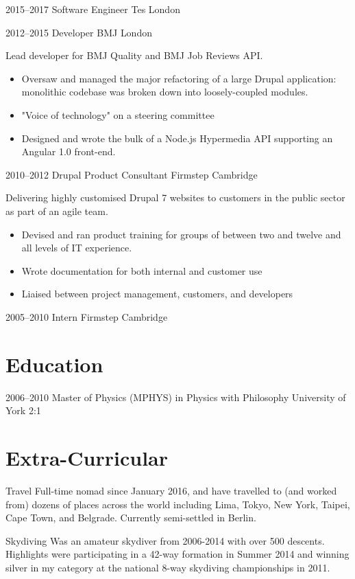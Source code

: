 \documentclass[10pt,a4paper,sans]{moderncv}
\begin{document}
\cventry
  {2015--2017}
  {Software Engineer}
  {Tes}
  {London}
  {}
  {}

\cventry
  {2012--2015}
  {Developer}
  {BMJ}
  {London}
  {}
  {
    Lead developer for BMJ Quality and BMJ Job Reviews API.
    \begin{itemize}
      \item Oversaw and managed the major refactoring of a large Drupal application: monolithic codebase was broken down into loosely-coupled modules.
      \item "Voice of technology" on a steering committee
      \item Designed and wrote the bulk of a Node.js Hypermedia API supporting an Angular 1.0 front-end.
    \end{itemize}
  }

\cventry
  {2010--2012}
  {Drupal Product Consultant}
  {Firmstep}
  {Cambridge}
  {}
  {
    Delivering highly customised Drupal 7 websites to customers in the public sector as part of an agile team.
    \begin{itemize}
      \item Devised and ran product training for groups of between two and twelve and all levels of IT experience.
      \item Wrote documentation for both internal and customer use
      \item Liaised between project management, customers, and developers
    \end{itemize}
  }

\cventry
  {2005--2010}
  {Intern}
  {Firmstep}
  {Cambridge}
  {}
  {}

\section{Education}

\cventry
  {2006--2010}
  {Master of Physics (\small{MPHYS}) in Physics with Philosophy}
  {University of York}
  {}
  {2:1}
  {}

\section{Extra-Curricular}

\cvitem
  {Travel}
  {
    Full-time nomad since January 2016, and have travelled to (and worked from) dozens of places across the world including Lima, Tokyo, New York, Taipei, Cape Town, and Belgrade. Currently semi-settled in Berlin.
  }

\cvitem
  {Skydiving}
  {
    Was an amateur skydiver from 2006-2014 with over 500 descents. Highlights were participating in a 42-way formation in Summer 2014 and winning silver in my category at the national 8-way skydiving championships in 2011.
  }
\end{document}
